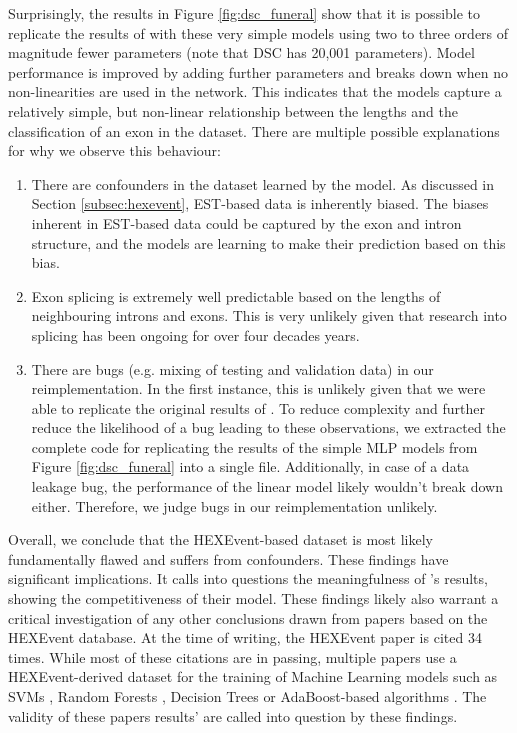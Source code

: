 Surprisingly, the results in Figure \ref{fig:dsc_funeral} show that it is possible to replicate the results of \cite{dsc} with these very simple models using two to three orders of magnitude fewer parameters (note that DSC has 20,001 parameters). Model performance is improved by adding further parameters and breaks down when no non-linearities are used in the network. This indicates that the models capture a relatively simple, but non-linear relationship between the lengths and the classification of an exon in the dataset. 
There are multiple possible explanations for why we observe this behaviour:
\begin{enumerate}
	\item There are confounders in the dataset learned by the model. As discussed in Section \ref{subsec:hexevent}, EST-based data is inherently biased. The biases inherent in EST-based data could be captured by the exon and intron structure, and the models are learning to make their prediction based on this bias. 
	\item Exon splicing is extremely well predictable based on the lengths of neighbouring introns and exons. This is very unlikely given that research into splicing has been ongoing for over four decades years. 
	\item There are bugs (e.g. mixing of testing and validation data) in our reimplementation. In the first instance, this is unlikely given that we were able to replicate the original results of \cite{dsc}. To reduce complexity and further reduce the likelihood of a bug leading to these observations, we extracted the complete code for replicating the results of the simple MLP models from Figure \ref{fig:dsc_funeral} into a single file. Additionally, in case of a data leakage bug, the performance of the linear model likely wouldn't break down either. Therefore, we judge bugs in our reimplementation unlikely.
\end{enumerate}

Overall, we conclude that the HEXEvent-based dataset is most likely fundamentally flawed and suffers from confounders.
These findings have significant implications. It calls into questions the meaningfulness of \cite{dsc}'s results, showing the competitiveness of their model. These findings likely also warrant a critical investigation of any other conclusions drawn from papers based on the HEXEvent database. At the time of writing, the HEXEvent paper is cited 34 times. While most of these citations are in passing, multiple papers use a HEXEvent-derived dataset for the training of Machine Learning models such as SVMs \cite{buschhertel}, Random Forests \cite{flawed4} \cite{flawed1}, Decision Trees \cite{flawed2} or AdaBoost-based algorithms \cite{flawed3}. The validity of these papers results' are called into question by these findings.


